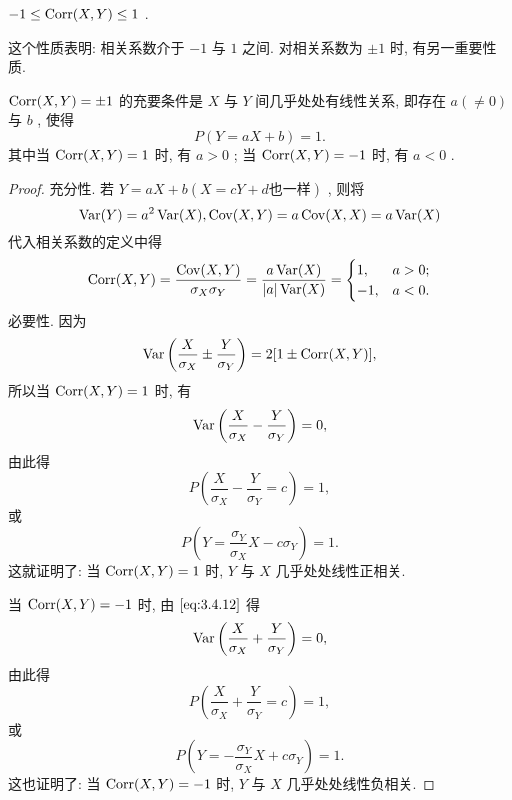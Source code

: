 	\begin{property}\label{pro:3.4.11}
		$-1\le\operatorname{Corr}(X,Y)\le1$ .

		这个性质表明: 相关系数介于 $-1$ 与 $1$ 之间. 对相关系数为 $\pm 1$ 时, 有另一重要性质.
	\end{property}
	\begin{property}\label{pro:3.4.12}
		$\operatorname{Corr}(X,Y)=\pm 1$ 的充要条件是 $X$ 与 $Y$ 间几乎处处有线性关系, 即存在 $a(\ne0)$ 与 $b$ , 使得
		\begin{equation*}
			P(Y=aX+b)=1.
		\end{equation*}
		其中当 $\operatorname{Corr}(X,Y)=1$ 时, 有 $a>0$ ; 当 $\operatorname{Corr}(X,Y)=-1$ 时, 有 $a<0$ .
		\begin{proof}
			充分性. 若 $Y=aX+b(X=cY+d\text{也一样})$ , 则将
			\begin{equation*}
				\operatorname{Var}(Y)=a^2\operatorname{Var}(X),\operatorname{Cov}(X,Y)=a\operatorname{Cov}(X,X)=a\operatorname{Var}(X)
			\end{equation*}
			代入相关系数的定义中得
			\begin{equation*}
				\operatorname{Corr}(X,Y)=\frac{\operatorname{Cov}(X,Y)}{\sigma_{X}\sigma_{Y}}=\frac{a\operatorname{Var}(X)}{|a|\operatorname{Var}(X)}=\begin{cases}
					1, & a>0;\\
					-1, & a<0.
				\end{cases}
			\end{equation*}
			必要性. 因为
			\begin{equation}\label{eq:3.4.12}
				\operatorname{Var}\left( \frac{X}{\sigma_{X}}\pm\frac{Y}{\sigma_{Y}} \right)=2[1\pm\operatorname{Corr}(X,Y)],
			\end{equation}
			所以当 $\operatorname{Corr}(X,Y)=1$ 时, 有
			\begin{equation*}
				\operatorname{Var}\left( \frac{X}{\sigma_{X}}-\frac{Y}{\sigma_{Y}} \right)=0,
			\end{equation*}
			由此得
			\begin{equation*}
				P\left( \frac{X}{\sigma_{X}}-\frac{Y}{\sigma_{Y}}=c \right)=1,
			\end{equation*}
			或
			\begin{equation*}
				P\left( Y=\frac{\sigma_{Y}}{\sigma_{X}}X-c\sigma_{Y} \right)=1.
			\end{equation*}
			这就证明了: 当 $\operatorname{Corr}(X,Y)=1$ 时, $Y$ 与 $X$ 几乎处处线性正相关.

			当 $\operatorname{Corr}(X,Y)=-1$ 时, 由 $\eqref{eq:3.4.12}$ 得
			\begin{equation*}
				\operatorname{Var}\left( \frac{X}{\sigma_{X}}+\frac{Y}{\sigma_{Y}} \right)=0,
			\end{equation*}
			由此得
			\begin{equation*}
				P\left( \frac{X}{\sigma_{X}}+\frac{Y}{\sigma_{Y}}=c \right)=1,
			\end{equation*}
			或
			\begin{equation*}
				P\left( Y=-\frac{\sigma_{Y}}{\sigma_{X}}X+c\sigma_{Y} \right)=1.
			\end{equation*}
			这也证明了: 当 $\operatorname{Corr}(X,Y)=-1$ 时, $Y$ 与 $X$ 几乎处处线性负相关.
		\end{proof}
	\end{property}
